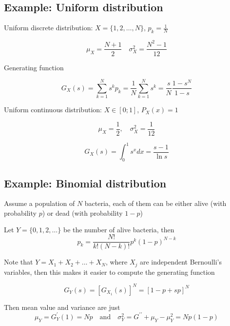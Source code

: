 \subsection{Example: Uniform distribution}
Uniform discrete distribution: $X = \{1, 2, \dots, N\}$, $p_k=\frac{1}{N}$

\begin{equation*}
    \mu_X = \frac{N+1}{2} \quad \sigma_X^2 = \frac{N^2 - 1}{12}
\end{equation*}

Generating function

\begin{equation*}
    G_X(s) = \sum_{k=1}^{N} s^{k} p_k = \frac{1}{N} \sum_{k=1}^N s^k = \frac{s}{N} \frac{1 - s^N}{1 -s}
\end{equation*}

Uniform continuous distribution: $X \in [0; 1]$, $P_X(x) = 1$

\begin{equation*}
    \mu_X = \frac{1}{2}, \quad \sigma^2_X = \frac{1}{12}
\end{equation*}

\begin{equation*}
    G_X(s) = \int_{0}^{1} s^x dx = \frac{s - 1}{\ln s}
\end{equation*}


\subsection*{Example: Binomial distribution}
Assume a population of $N$ bacteria, each of them can be either alive (with probability $p$) or dead (with probability $1-p$)

Let $Y = \{0, 1, 2, \dots \}$ be the number of alive bacteria, then
\begin{equation*}
    p_k = \frac{N!}{k! (N-k)!} p^k (1-p)^{N-k}
\end{equation*}

Note that $Y = X_1 + X_2 + \dots + X_N$, where $X_j$ are independent Bernoulli's variables, then this makes it easier to compute the generating function

\begin{equation*}
    G_Y(s) = [G_{X_1}(s)]^N = [1-p+sp]^N
\end{equation*}

Then mean value and variance are just
\begin{equation*}
    \mu_Y = G^{\prime}_Y(1) = Np \quad \text{and} \quad \sigma^2_Y = G^{\prime \prime} + \mu_Y - \mu^2_Y = Np(1-p)
\end{equation*}


